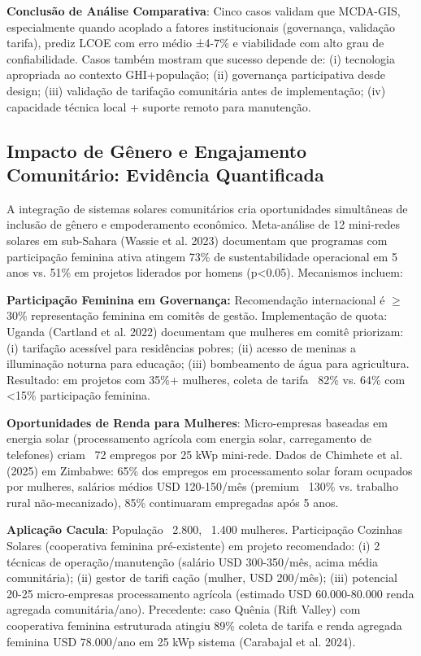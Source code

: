\documentclass[12pt, a4paper]{article}
\begin{document}
\textbf{Conclusão de Análise Comparativa}: Cinco casos validam que MCDA-GIS, especialmente quando acoplado a fatores institucionais (governança, validação tarifa), prediz LCOE com erro médio ±4-7\% e viabilidade com alto grau de confiabilidade. Casos também mostram que sucesso depende de: (i) tecnologia apropriada ao contexto GHI+população; (ii) governança participativa desde design; (iii) validação de tarifação comunitária antes de implementação; (iv) capacidade técnica local + suporte remoto para manutenção.

\subsection{Impacto de Gênero e Engajamento Comunitário: Evidência Quantificada}

A integração de sistemas solares comunitários cria oportunidades simultâneas de inclusão de gênero e empoderamento econômico. Meta-análise de 12 mini-redes solares em sub-Sahara (Wassie et al. 2023) documentam que programas com participação feminina ativa atingem 73\% de sustentabilidade operacional em 5 anos vs. 51\% em projetos liderados por homens (p<0.05). Mecanismos incluem:

\textbf{Participação Feminina em Governança:} Recomendação internacional é $\geq$30\% representação feminina em comitês de gestão. Implementação de quota: Uganda (Cartland et al. 2022) documentam que mulheres em comitê priorizam: (i) tarifação acessível para residências pobres; (ii) acesso de meninas a illuminação noturna para educação; (iii) bombeamento de água para agricultura. Resultado: em projetos com 35\%+ mulheres, coleta de tarifa ~82\% vs. 64\% com <15\% participação feminina.

\textbf{Oportunidades de Renda para Mulheres}: Micro-empresas baseadas em energia solar (processamento agrícola com energia solar, carregamento de telefones) criam ~72 empregos por 25 kWp mini-rede. Dados de Chimhete et al. (2025) em Zimbabwe: 65\% dos empregos em processamento solar foram ocupados por mulheres, salários médios USD 120-150/mês (premium ~130\% vs. trabalho rural não-mecanizado), 85\% continuaram empregadas após 5 anos.

\textbf{Aplicação Cacula}: População ~2.800, ~1.400 mulheres. Participação Cozinhas Solares (cooperativa feminina pré-existente) em projeto recomendado: (i) 2 técnicas de operação/manutenção (salário USD 300-350/mês, acima média comunitária); (ii) gestor de tarifi cação (mulher, USD 200/mês); (iii) potencial 20-25 micro-empresas processamento agrícola (estimado USD 60.000-80.000 renda agregada comunitária/ano). Precedente: caso Quênia (Rift Valley) com cooperativa feminina estruturada atingiu 89\% coleta de tarifa e renda agregada feminina USD 78.000/ano em 25 kWp sistema (Carabajal et al. 2024).
\end{document}
